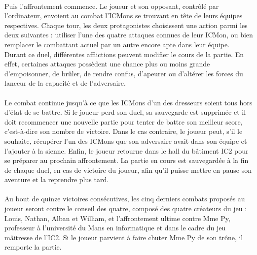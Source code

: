 \documentclass[12pt,a4paper, twoside]{article}
\begin{document}
        \paragraph{} Puis l'affrontement commence. Le joueur et son opposant, contrôlé par l'ordinateur, envoient au combat l'ICMons se trouvant en tête de leurs équipes respectives. Chaque tour, les deux protagonistes choisissent une action parmi les deux suivantes : utiliser l'une des quatre attaques connues de leur ICMon, ou bien remplacer le combattant actuel par un autre encore apte dans leur équipe.
        Durant ce duel, différentes afflictions peuvent modifier le cours de la partie. En effet, certaines attaques possèdent une chance plus ou moins grande d'empoisonner, de brûler, de rendre confus, d'apeurer ou d'altérer les forces du lanceur de la capacité et de l'adversaire. \paragraph{}
        Le combat continue jusqu'à ce que les ICMons d'un des dresseurs soient tous hors d'état de se battre. Si le joueur perd son duel, sa sauvegarde est supprimée et il doit recommencer une nouvelle partie pour tenter de battre son meilleur score, c'est-à-dire son nombre de victoire.
        Dans le cas contraire, le joueur peut, s'il le souhaite, récupérer l'un des ICMons que son adversaire avait dans son équipe et l'ajouter à la sienne. Enfin, le joueur retourne dans le hall du bâtiment IC2 pour se préparer au prochain affrontement.
        La partie en cours est sauvegardée à la fin de chaque duel, en cas de victoire du joueur, afin qu'il puisse mettre en pause son aventure et la reprendre plus tard. \paragraph{}
        Au bout de quinze victoires consécutives, les cinq derniers combats proposés au joueur seront contre le conseil des quatre, composé des quatre créateurs du jeu : Louis, Nathan, Alban et William, et l'affrontement ultime contre Mme Py, professeur à l'université du Mans en informatique et dans le cadre du jeu mâitresse de l'IC2.
        Si le joueur parvient à faire chuter Mme Py de son trône, il remporte la partie. 


\newpage
\end{document}
